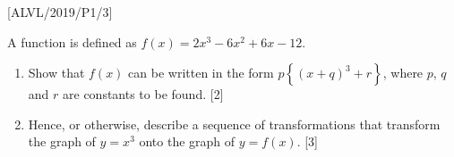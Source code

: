 \item {[}ALVL/2019/P1/3{]}

A function is defined as $f\left(x\right)=2x^{3}-6x^{2}+6x-12$. 
\begin{enumerate}
\item Show that $f\left(x\right)$ can be written in the form $p\left\{ \left(x+q\right)^{3}+r\right\} $,
where $p$, $q$ and $r$ are constants to be found.\hfill{} {[}2{]}
\item Hence, or otherwise, describe a sequence of transformations that transform
the graph of $y=x^{3}$ onto the graph of $y=f\left(x\right)$.\hfill{}
{[}3{]}
\end{enumerate}
